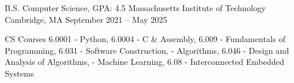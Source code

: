 \documentclass[12pt, letterpaper]{awesome-cv}
\begin{document}
\makecvheader

\begin{cventries}
  \cventry
    {B.S. Computer Science, GPA: 4.5} %
    {Massachusetts Institute of Technology} %
    {Cambridge, MA} %
    {September 2021 -- May 2025} %
    {
      \vspace{-0.11in}
      \begin{cvskills}
        \cvskill
          {CS Courses} %
          {6.0001 - Python, 6.0004 - C \& Assembly, 6.009 - Fundamentals of Programming, 6.031 - Software Construction,
           - Algorithms, 6.046 - Design and Analysis of Algorithms,
           - Machine Learning, 6.08 - Interconnected Embedded Systems} %
      \end{cvskills}
    }
  \vspace{-0.3in}
\end{cventries} 
\end{document}
